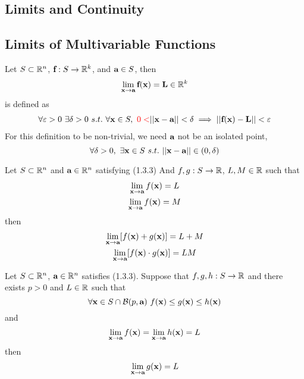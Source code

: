 \documentclass[11pt]{article}
\begin{document}
		\subsection{Limits and Continuity}
			\subsection{Limits of Multivariable Functions}
			\begin{definition}
				Let $S \subset \mathbb{R}^n$, $\textbf{f}: S \to \mathbb{R}^k$, and $\textbf{a} \in S$, then
				\begin{equation}
					\lim_{\textbf{x} \to \textbf{a}} \textbf{f}(\textbf{x}) = \textbf{L} \in \mathbb{R}^k
				\end{equation}
				is defined as
				\begin{gather}
					\forall \varepsilon > 0\ \exists \delta > 0\ s.t.\ \forall \ve{x} \in S,\ \red{0 <} \norm{\ve{x} - \ve{a}} < \delta \implies \norm{\ve{f}(\ve{x}) - \ve{L}} < \varepsilon
				\end{gather}
				For this definition to be non-trivial, we need $\textbf{a}$ not be an isolated point,
				\begin{equation}
					\forall \delta > 0,\ \exists \textbf{x} \in S\ s.t.\ \vert \vert {\textbf{x} - \textbf{a}} \vert \vert \in (0, \delta)
				\end{equation}
			\end{definition}
			
			\begin{theorem}
				Let $S \subset \mathbb{R}^n$ and $\textbf{a} \in \mathbb{R}^n$ satisfying (1.3.3)
				And $f, g: S \to \mathbb{R}$, $L, M \in \mathbb{R}$ such that
				\begin{gather}
					\lim_{\textbf{x} \to \textbf{a}} f(\textbf{x}) = L \\
					\lim_{\textbf{x} \to \textbf{a}} f(\textbf{x}) = M
				\end{gather}
				then 
				\begin{gather}
					\lim_{\textbf{x} \to \textbf{a}} [f(\textbf{x})	+ g(\textbf{x})] = L + M\\
					\lim_{\textbf{x} \to \textbf{a}} [f(\textbf{x}) \cdot g(\textbf{x})] = LM
				\end{gather}
			\end{theorem}
			
			\begin{theorem}
				Let $S \subset \mathbb{R}^n$, $\textbf{a} \in \mathbb{R}^n$ satisfies (1.3.3). Suppose that $f, g, h: S \to \mathbb{R}$ and there exists $p > 0$ and $L \in \mathbb{R}$ such that
				\begin{equation}
					\forall \ve{x} \in S \cap \mc{B}(p, \ve{a})\ f(\ve{x}) \leq g(\ve{x}) \leq h(\ve{x})
				\end{equation}
				and 
				\begin{equation}
					\lim_{\textbf{x} \to \textbf{a}} f(\textbf{x}) = \lim_{\textbf{x} \to \textbf{a}} h(\textbf{x}) = L
				\end{equation}
				then 
				\begin{equation}
					\lim_{\textbf{x} \to \textbf{a}} g(\textbf{x}) = L
				\end{equation}
			\end{theorem}
			
\end{document}
